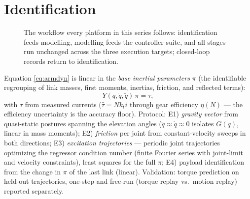 \documentclass[conference]{IEEEtran}
\begin{document}
\section{Identification}

\begin{figure}[!t]
\centering
{}
\caption{The workflow every platform in this series follows: identification feeds modelling, modelling feeds the controller suite, and all stages run unchanged across the three execution targets; closed-loop records return to identification.}
\label{fig:workflow}
\end{figure}
Equation \eqref{eq:armdyn} is linear in the \emph{base inertial parameters} $\pi$ (the identifiable regrouping of link masses, first moments, inertias, friction, and reflected terms):
\begin{equation}
Y(q, \dot q, \ddot q)\,\pi = \tau,
\end{equation}
with $\tau$ from measured currents ($\hat\tau = N k_t i$ through gear efficiency $\eta(N)$ --- the efficiency uncertainty is the accuracy floor). Protocol: E1) \emph{gravity vector} from quasi-static postures spanning the elevation angles ($\ddot q \approx \dot q \approx 0$ isolates $G(q)$, linear in mass moments); E2) \emph{friction} per joint from constant-velocity sweeps in both directions; E3) \emph{excitation trajectories} --- periodic joint trajectories optimizing the regressor condition number (finite Fourier series with joint-limit and velocity constraints), least squares for the full $\pi$; E4) payload identification from the change in $\pi$ of the last link (linear). Validation: torque prediction on held-out trajectories, one-step and free-run (torque replay vs.\ motion replay) reported separately.
\end{document}
